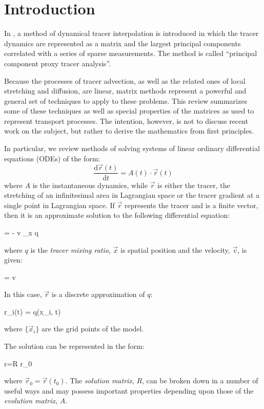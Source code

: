 
\section{Introduction}

In \citet{Mills2018}, a method of dynamical tracer interpolation
is introduced
in which the tracer dynamics are represented as a matrix and the largest
principal components correlated with a series of sparse measurements.
The method is called ``principal component proxy tracer analysis''.

Because the processes of tracer advection, as well as the related ones
of local stretching and diffusion, are linear, 
matrix methods represent a powerful and
general set of techniques to apply to these problems.
This review summarizes some of these techniques as well as special properties
of the matrices as used to represent transport processes.  
The intention, however, is not to discuss recent work on the subject, but
rather to derive the mathematics from first principles.

In particular, 
we review methods of solving systems of linear ordinary differential
equations (ODEs) of the form:
\begin{equation}
\frac{\mathrm d \vec r(t)}{\mathrm d t} = A(t) \cdot \vec r(t)
\end{equation}
where $A$ is the instantaneous dynamics, while $\vec r$ is either the tracer,
the stretching of an infinitesimal area in Lagrangian space or the tracer gradient at a single point
in Lagrangian space. 
If $\vec r$ represents the tracer and is a finite vector,
then it is an approximate solution to the following differential equation:
\begin{eqnl}
	 = - \vec v \cdot \nabla_{\vec x} q
\end{eqnl}
where $q$ is the {\it tracer mixing ratio}, $\vec x$ is spatial position and the velocity, $\vec v$, is given:
\begin{eqnl}
	 = \vec v
\end{eqnl}
In this case, $\vec r$ is a discrete approximation of $q$:
\begin{eqnl}
	r_i(t) = q(\vec x_i, t)
\end{eqnl}
where $\lbrace \vec x_i \rbrace$ are the grid points of the model.

The solution can be represented in the form:
\begin{eqnl}
	\vec r=R \cdot \vec r_0
\end{eqnl}
where $\vec r_0=\vec r(t_0)$.
The {\it solution matrix}, $R$, can be broken down in a number of useful ways
and may possess important properties depending upon those of
the {\it evolution matrix}, $A$.

